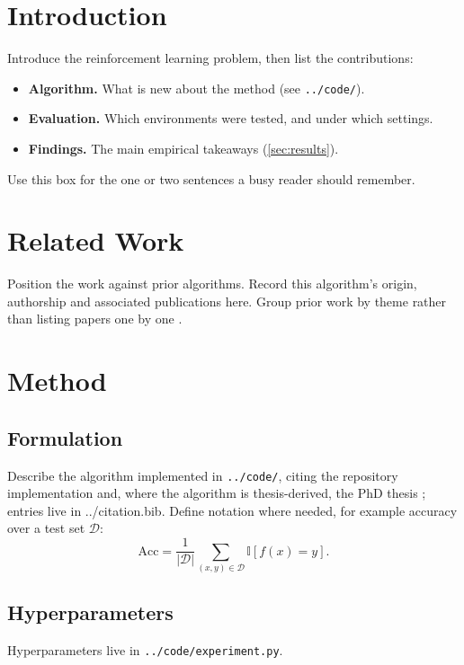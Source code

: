 \documentclass[11pt]{article}
\begin{document}
\section{Introduction}
Introduce the reinforcement learning problem, then list the contributions:

\begin{itemize}
  \item \textbf{Algorithm.} What is new about the method (see \texttt{../code/}).
  \item \textbf{Evaluation.} Which environments were tested, and under which settings.
  \item \textbf{Findings.} The main empirical takeaways (\cref{sec:results}).
\end{itemize}

\begin{takeaway}
Use this box for the one or two sentences a busy reader should remember.
\end{takeaway}

\section{Related Work}
Position the work against prior algorithms. Record this algorithm's origin,
authorship and associated publications here. Group prior work by theme rather
than listing papers one by one \citep{xie2023pixiu}.

\section{Method}
\label{sec:method}
\subsection{Formulation}
Describe the algorithm implemented in \texttt{../code/}, citing the
repository implementation \citep{ai_ml_research} and, where the algorithm
is thesis-derived, the PhD thesis \citep{ronnie_stafford_thesis_2020};
entries live in ../citation.bib. Define notation where
needed, for example accuracy over a test set $\mathcal{D}$:
\begin{equation}
  \mathrm{Acc} = \frac{1}{|\mathcal{D}|}\sum_{(x,y)\in\mathcal{D}} \mathbb{I}\left[f(x) = y\right].
\end{equation}

\subsection{Hyperparameters}
\begin{promptbox}
Hyperparameters live in \texttt{../code/experiment.py}.
\end{promptbox}
\end{document}
